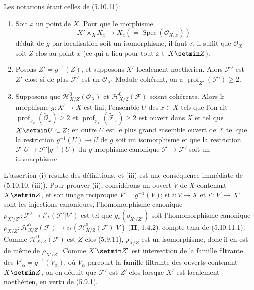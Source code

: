 \begin{proposition}[5.10.12]
\label{IV.2.s5.10.12-fr}
Les notations étant celles de \textup{(5.10.11)}:
\begin{enumerate}
\item[\textup{(i)}] Soit $x$ un point de $X$. Pour que le morphisme
\[
X'\times_X X_x\longrightarrow X_x(=\operatorname{Spec}(\mathcal O_{X,x}))
\]
déduit de $g$ par localisation soit un isomorphisme, il faut et il suffit que
$\mathcal O_X$ soit $Z$-clos au point $x$ (ce qui a lieu pour tout $x\in X\setmin Z$).
\item[\textup{(ii)}] Posons $Z'=g^{-1}(Z)$, et supposons $X'$ localement noethérien.
Alors $\mathcal F'$ est $Z'$-clos; si de plus $\mathcal F'$ est un
$\mathcal O_{X'}$-Module cohérent, on a
$\operatorname{prof}_{Z'}(\mathcal F')\geq2$.
\item[\textup{(iii)}] Supposons que $\mathcal H^0_{X/Z}(\mathcal O_X)$ et
$\mathcal H^0_{X/Z}(\mathcal F)$ soient cohérents. Alors le morphisme
$g:X'\to X$ est fini; l'ensemble $U$ des $x\in X$ tels que l'on ait
$\operatorname{prof}_{Z_x}(\widetilde{\mathcal O}_x)\geq2$ et
$\operatorname{prof}_{Z_x}(\widetilde{\mathcal F}_x)\geq2$ est ouvert dans
$X$ et tel que $X\setmin U\subset Z$; en outre $U$ est le plus grand ensemble ouvert
de $X$ tel que la restriction $g^{-1}(U)\to U$ de $g$ soit un isomorphisme et
que la restriction $\mathcal F|U\to\mathcal F'|g^{-1}(U)$ du $g$-morphisme
canonique $\mathcal F\to\mathcal F'$ soit un isomorphisme.
\end{enumerate}
\end{proposition}

L'assertion (i) résulte des définitions, et (iii) est une conséquence immédiate
de (5.10.10, (iii)). Pour prouver (ii), considérons un ouvert $V$ de $X$
contenant $X\setmin Z$, et son image réciproque $V'=g^{-1}(V)$; si $i:V\to X$ et
$i':V'\to X'$ sont les injections
canoniques, l'homomorphisme canonique
$\rho_{X'/Z'}:\mathcal F'\to i'_*(\mathcal F'|V')$ est tel que
$g_*(\rho_{X'/Z'})$ soit l'homomorphisme canonique
$\rho_{X/Z}:\mathcal H^0_{X/Z}(\mathcal F)
\to i_*(\mathcal H^0_{X/Z}(\mathcal F)|V)$
(\textbf{II}, 1.4.2), compte tenu de (5.10.11.1). Comme
$\mathcal H^0_{X/Z}(\mathcal F)$ est $Z$-clos (5.9.11), $\rho_{X/Z}$ est un
isomorphisme, donc il en est de même de $\rho_{X'/Z'}$. Comme $X'\setmin Z'$ est
intersection de la famille filtrante des $V'_\alpha=g^{-1}(V_\alpha)$, où
$V_\alpha$ parcourt la famille filtrante des ouverts contenant $X\setmin Z$, on en
déduit que $\mathcal F'$ est $Z'$-clos lorsque $X'$ est localement noethérien,
en vertu de (5.9.1).


